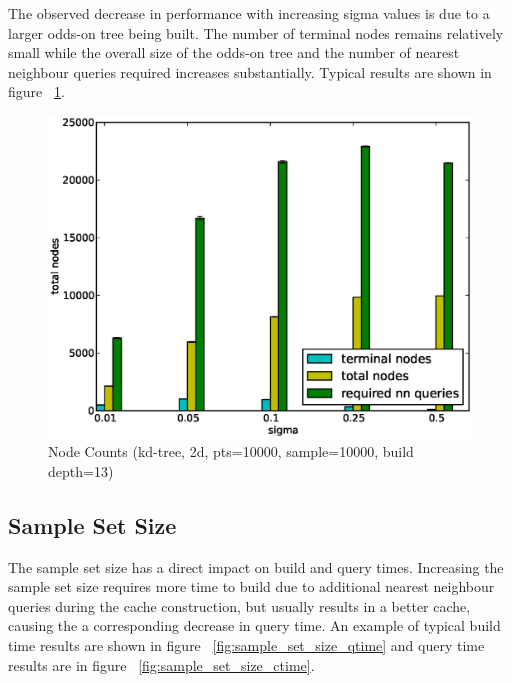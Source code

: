\documentclass[mcs]{scsthesis}
\begin{document}
The observed decrease in performance with increasing sigma values is due to
a larger odds-on tree being built. The number of terminal nodes remains
relatively small while the overall size of the odds-on tree and the number of
nearest neighbour queries required increases substantially. Typical results are
shown in figure ~\ref{fig:node_counts}.

\begin{figure}
\begin{center}
\includegraphics[scale=0.5]{diagrams/2d_pts10000_sample10000_builddata.eps}
\caption{Node Counts (kd-tree, 2d, pts=10000, sample=10000, build depth=13)}
\label{fig:node_counts}
\end{center}
\end{figure}

\subsection{Sample Set Size}

The sample set size has a direct impact on build and query times. Increasing
the sample set size requires more time to build due to additional nearest
neighbour queries during the cache construction, but usually results in a
better cache, causing the a corresponding decrease in query time.  An example
of typical build time results are shown in figure
~\ref{fig:sample_set_size_qtime} and query time results are in figure
~\ref{fig:sample_set_size_ctime}.
\end{document}
